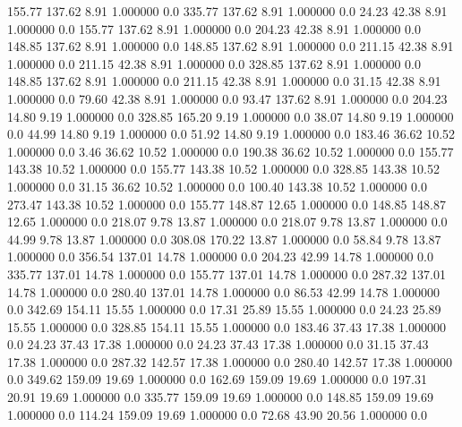   155.77  137.62    8.91    1.000000    0.0
  335.77  137.62    8.91    1.000000    0.0
   24.23   42.38    8.91    1.000000    0.0
  155.77  137.62    8.91    1.000000    0.0
  204.23   42.38    8.91    1.000000    0.0
  148.85  137.62    8.91    1.000000    0.0
  148.85  137.62    8.91    1.000000    0.0
  211.15   42.38    8.91    1.000000    0.0
  211.15   42.38    8.91    1.000000    0.0
  328.85  137.62    8.91    1.000000    0.0
  148.85  137.62    8.91    1.000000    0.0
  211.15   42.38    8.91    1.000000    0.0
   31.15   42.38    8.91    1.000000    0.0
   79.60   42.38    8.91    1.000000    0.0
   93.47  137.62    8.91    1.000000    0.0
  204.23   14.80    9.19    1.000000    0.0
  328.85  165.20    9.19    1.000000    0.0
   38.07   14.80    9.19    1.000000    0.0
   44.99   14.80    9.19    1.000000    0.0
   51.92   14.80    9.19    1.000000    0.0
  183.46   36.62   10.52    1.000000    0.0
    3.46   36.62   10.52    1.000000    0.0
  190.38   36.62   10.52    1.000000    0.0
  155.77  143.38   10.52    1.000000    0.0
  155.77  143.38   10.52    1.000000    0.0
  328.85  143.38   10.52    1.000000    0.0
   31.15   36.62   10.52    1.000000    0.0
  100.40  143.38   10.52    1.000000    0.0
  273.47  143.38   10.52    1.000000    0.0
  155.77  148.87   12.65    1.000000    0.0
  148.85  148.87   12.65    1.000000    0.0
  218.07    9.78   13.87    1.000000    0.0
  218.07    9.78   13.87    1.000000    0.0
   44.99    9.78   13.87    1.000000    0.0
  308.08  170.22   13.87    1.000000    0.0
   58.84    9.78   13.87    1.000000    0.0
  356.54  137.01   14.78    1.000000    0.0
  204.23   42.99   14.78    1.000000    0.0
  335.77  137.01   14.78    1.000000    0.0
  155.77  137.01   14.78    1.000000    0.0
  287.32  137.01   14.78    1.000000    0.0
  280.40  137.01   14.78    1.000000    0.0
   86.53   42.99   14.78    1.000000    0.0
  342.69  154.11   15.55    1.000000    0.0
   17.31   25.89   15.55    1.000000    0.0
   24.23   25.89   15.55    1.000000    0.0
  328.85  154.11   15.55    1.000000    0.0
  183.46   37.43   17.38    1.000000    0.0
   24.23   37.43   17.38    1.000000    0.0
   24.23   37.43   17.38    1.000000    0.0
   31.15   37.43   17.38    1.000000    0.0
  287.32  142.57   17.38    1.000000    0.0
  280.40  142.57   17.38    1.000000    0.0
  349.62  159.09   19.69    1.000000    0.0
  162.69  159.09   19.69    1.000000    0.0
  197.31   20.91   19.69    1.000000    0.0
  335.77  159.09   19.69    1.000000    0.0
  148.85  159.09   19.69    1.000000    0.0
  114.24  159.09   19.69    1.000000    0.0
   72.68   43.90   20.56    1.000000    0.0
